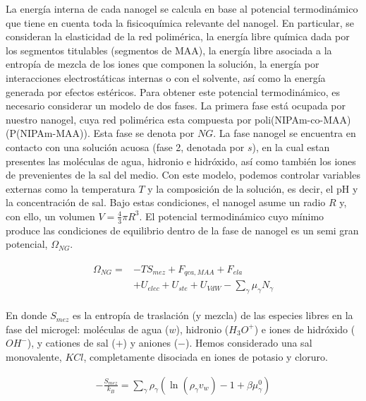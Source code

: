 	La energ\'ia interna de cada nanogel se calcula en base al potencial termodin\'amico que tiene en cuenta toda la fisicoqu\'imica relevante del nanogel. En particular, se consideran la elasticidad de la red polim\'erica, la energ\'ia libre qu\'imica dada por los segmentos titulables (segmentos de MAA), la energ\'ia libre asociada a la entrop\'ia de mezcla de los iones que componen la soluci\'on, la energ\'ia por interacciones electrost\'aticas internas o con el solvente, as\'i como la energ\'ia generada por efectos est\'ericos.
	Para obtener este potencial termodin\'amico, es necesario considerar un modelo de dos fases. La primera fase est\'a ocupada por nuestro nanogel, cuya red polim\'erica esta compuesta por poli(NIPAm-co-MAA) (P(NIPAm-MAA)). Esta fase se denota por $NG$. La fase nanogel se encuentra en contacto con una soluci\'on acuosa (fase 2, denotada por $s$), en la cual estan presentes las mol\'eculas de agua, hidronio e hidr\'oxido, as\'i como tambi\'en los iones de prevenientes de la sal del medio.
	Con este modelo, podemos controlar variables externas como la temperatura $T$ y la composici\'on de la soluci\'on, es decir, el pH y la concentraci\'on de sal. Bajo estas condiciones, el nanogel asume un radio $R$ y, con ello, un volumen $V=\frac{4}{3}\pi R^3$.
	El potencial termodin\'amico cuyo m\'inimo produce las condiciones de equilibrio dentro de la fase de nanogel es un semi gran potencial, $\Omega_{NG}$.
	
	
	
	\begin{align}
		\begin{aligned}
			\Omega_{NG}=& -TS_{mez} + F_{qca,MAA} +  F_{ela}\\
			& + U_{elec}+  U_{ste} + U_{VdW} -{\sum_{\gamma}
				{\mu_\gamma N_\gamma}}
		\end{aligned}
		\label{eq:mc:free-energy-implicit}
	\end{align}
	
	
	\noindent En donde $S_{mez}$ es la entrop\'ia de traslaci\'on (y mezcla) de las especies libres en la fase del microgel: mol\'eculas de agua ($w$), hidronio ($H_3O^+$) e iones de hidr\'oxido ($OH^-$), y cationes de sal ($+$) y aniones ($-$).
	Hemos considerado una sal monovalente, $KCl$,  completamente disociada en iones de potasio y cloruro.
	
	\begin{align}
		-\frac{S_{mez}}{k_B}	= \sum_{\gamma} \rho_\gamma\left(\ln\left(\rho_\gamma v_w\right) -1 + \beta\mu^0_\gamma\right) 
	\end{align}
	
